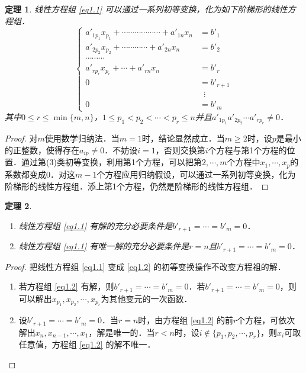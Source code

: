 \documentclass[a4paper,fontset=windows]{ctexbook}
\newtheorem{theorem}{定理}[chapter]
\theoremstyle{definition}
\renewcommand{\le}{\leqslant}
\renewcommand{\ge}{\geqslant}
\begin{document}
\begin{theorem}
线性方程组 \eqref{eq1.1} 可以通过一系列初等变换，化为如下阶梯形的线性方程组．
\begin{equation}\label{eq1.2}
\left\{\begin{aligned}
a'_{1p_1}x_{p_1}+\cdots\cdots\cdots\cdots\cdots\cdots+a'_{1n}x_n&=b'_1 \\
a'_{2p_2}x_{p_2}+\cdots\cdots\cdots\cdots+a'_{2n}x_n&=b'_2 \\
\cdots\cdots\cdots\hspace{40pt}& \\
a'_{rp_r}x_{p_r}+\cdots+a'_{rn}x_n&=b'_r \\
0&=b'_{r+1} \\
&\hspace{6pt}\vdots \\
0&=b'_m
\end{aligned}\right.
\end{equation}
其中$0\le r\le\min\{m,n\}$，$1\le p_1<p_2<\cdots<p_r\le n$并且$a'_{1p_1}a'_{2p_2}\cdots a'_{rp_r}\ne 0$．
\end{theorem}

\begin{proof}
对$m$使用数学归纳法．当$m=1$时，结论显然成立．当$m\ge 2$时，设$p$是最小的正整数，使得存在$a_{ip}\ne 0$．不妨设$i=1$，否则交换第$i$个方程与第1个方程的位置．通过第(3)类初等变换，利用第1个方程，可以把第$2,\cdots,m$个方程中$x_1,\cdots,x_p$的系数都变成0．对这$m-1$个方程应用归纳假设，可以通过一系列初等变换，化为阶梯形的线性方程组．添上第1个方程，仍然是阶梯形的线性方程组．
\end{proof}

\begin{theorem}~
\begin{enumerate}
\item 线性方程组 \eqref{eq1.1} 有解的充分必要条件是$b'_{r+1}=\cdots=b'_m=0$．
\item 线性方程组 \eqref{eq1.1} 有唯一解的充分必要条件是$r=n$且$b'_{r+1}=\cdots=b'_m=0$．
\end{enumerate}
\end{theorem}

\begin{proof}
把线性方程组 \eqref{eq1.1} 变成 \eqref{eq1.2} 的初等变换操作不改变方程祖的解．
\begin{enumerate}
\item 若方程组 \eqref{eq1.2} 有解，则$b'_{r+1}=\cdots=b'_m=0$．若$b'_{r+1}=\cdots=b'_m=0$，则可以解出$x_{p_1},x_{p_2},\cdots,x_{p_r}$为其他变元的一次函数．

\item 设$b'_{r+1}=\cdots=b'_m=0$．当$r=n$时，由方程组 \eqref{eq1.2} 的前$r$个方程，可依次解出$x_n,x_{n-1},\cdots,x_1$，解是唯一的．当$r<n$时，设$i\notin\{p_1,p_2,\cdots,p_r\}$，则$x_i$可取任意值，方程组 \eqref{eq1.2} 的解不唯一．\qedhere
\end{enumerate}
\end{proof}
\end{document}
